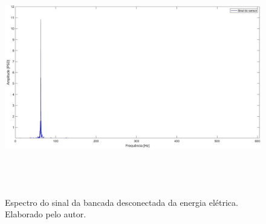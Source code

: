 \documentclass[
	12pt,				
	oneside,			
	a4paper,			
	english,			
	brazil,			
	]{abntex2ppgsi}
\begin{document}
\begin{figure}[H]
\caption {Espectro do sinal da bancada desconectada da energia elétrica. Elaborado pelo autor.}
\includegraphics[height=95mm,keepaspectratio]{Caso0/PSD_SENSOR_MAQUINA_DESLIGADA}
\label{PSD_SENSOR_MAQUINA_DESLIGADA}
\end{figure} 
\end{document}
